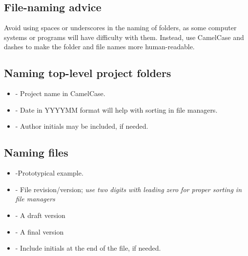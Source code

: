 \subsection{File-naming advice}

Avoid using spaces or underscores in the naming of folders, as some computer systems or programs will have difficulty with them. Instead, use CamelCase and dashes to make the folder and file names more human-readable.

\subsection{Naming top-level project folders}

\begin{itemize}
\item {} 

\hspace{.25cm} - Project name in CamelCase.

\item {} 

\hspace{.25cm} - Date in YYYYMM format will help with sorting in file managers.

\item {} 

\hspace{.25cm} - Author initials may be included, if needed.
\end{itemize}

\subsection{Naming files}


\begin{itemize}

\item {} 

\hspace{.25cm} -Prototypical example.

\item {} 

\hspace{.25cm} - File revision/version; \emph{use two digits with leading zero for proper sorting in file managers}

\item {} 

\hspace{.25cm} - A draft version

\item {} 

\hspace{.25cm} - A final version

\item {} 

\hspace{.25cm} - Include initials at the end of the file, if needed.

\end{itemize}

